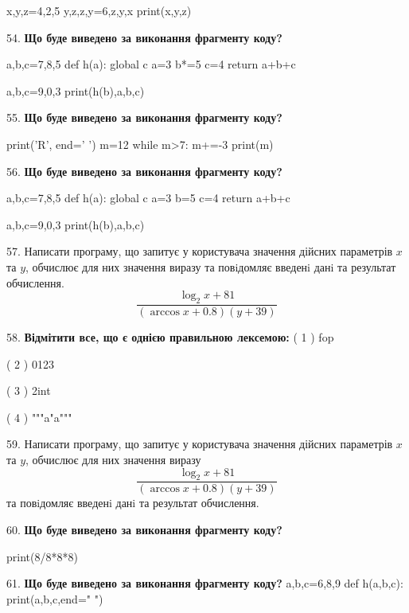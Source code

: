 \documentclass[11pt]{article}
\begin{document}
x,y,z=4,2,5
y,z,z,y=6,z,y,x
print(x,y,z)
\par\vspace{5mm}
54. \textbf{Що буде виведено за виконання фрагменту коду?}

a,b,c=7,8,5
def h(a):
global c    a=3
    b*=5
    c=4
    return a+b+c

a,b,c=9,0,3
print(h(b),a,b,c)
\par\vspace{5mm}
55. \textbf{Що буде виведено за виконання фрагменту коду?}

print('R', end=' ')
m=12
while m>7:
    m+=-3
print(m)

\par\vspace{5mm}
56. \textbf{Що буде виведено за виконання фрагменту коду?}

a,b,c=7,8,5
def h(a):
global c    a=3
    b=5
    c=4
    return a+b+c

a,b,c=9,0,3
print(h(b),a,b,c)
\par\vspace{5mm}
57. 
Написати програму, що запитує у користувача значення дійсних параметрів $x$ та $y$, обчислює для них значення виразу та повiдомляє введенi данi та результат обчислення.
$$\frac{\log_{2} x + 81}{(\arccos x + 0.8) (y + 39)}$$ 

\par\vspace{5mm}
58. %
\textbf{Відмітити все, що є однією правильною лексемою:}
( 1 ) fop

( 2 ) 0123

( 3 ) 2int

( 4 ) """a"a"""
\par\vspace{5mm}
59. 
Написати програму, що запитує у користувача значення дійсних параметрів $x$ та $y$, обчислює для них значення виразу 
$$\frac{\log_{2} x + 81}{(\arccos x + 0.8) (y + 39)}$$ 
та повiдомляє введенi данi та результат обчислення.

\par\vspace{5mm}
60. \textbf{Що буде виведено за виконання фрагменту коду?}

print(8/8*8*8)
\par\vspace{5mm}
61. \textbf{Що буде виведено за виконання фрагменту коду?}
a,b,c=6,8,9
def h(a,b,c):
    print(a,b,c,end=" ")
\end{document}
